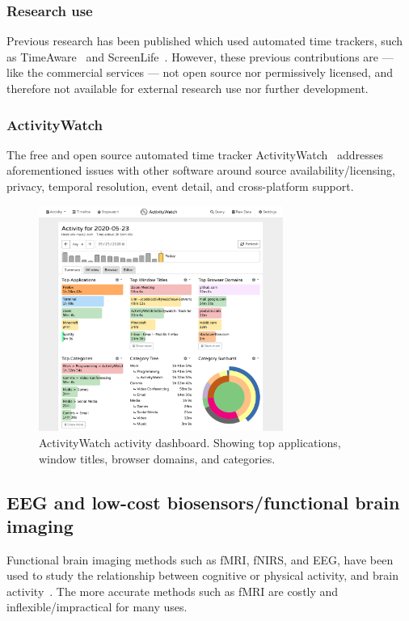 \documentclass[a4paper]{article}
\begin{document}
\begin{refsection}
    \subsubsection{Research use}

        Previous research has been published which used automated time trackers, such as TimeAware~\cite{kim_timeaware_2016} and ScreenLife~\cite{rooksby_personal_2016}. However, these previous contributions are --- like the commercial services --- not open source nor permissively licensed, and therefore not available for external research use nor further development.

    \subsubsection{ActivityWatch}

        The free and open source automated time tracker ActivityWatch~\cite{bjareholt_activitywatch_2020} addresses aforementioned issues with other software around source availability/licensing, privacy, temporal resolution, event detail, and cross-platform support.

        \begin{figure}[h]
        \centering
        \includegraphics[width=8cm]{img/screenshot-aw-activity.png}
        \caption{ActivityWatch activity dashboard. Showing top applications, window titles, browser domains, and categories.}\label{fig:aw}
        \end{figure}

\subsection{EEG and low-cost biosensors/functional brain imaging}

    Functional brain imaging methods such as fMRI, fNIRS, and EEG, have been used to study the relationship between cognitive or physical activity, and brain activity~\cite{floyd_decoding_2017}\cite{hong_classification_2015}\cite{fucci_replication_2019}. The more accurate methods such as fMRI are costly and inflexible/impractical for many uses.


\end{refsection}
\end{document}
